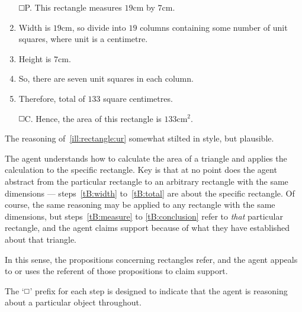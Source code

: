 \begin{note}[]
  \begin{illustration}\label{ill:rectangle:ur}
    \vspace{-\baselineskip}
    \begin{enumerate}[label=\(\protect\tBox\)\space\arabic*., ref=(\(\protect\tBox\)\space\arabic*), align=left, leftmargin=*]
    \item[\(\protect\tBox\)\space P.]\label{tB:measure} This rectangle measures \(19\text{cm}\) by \(7\text{cm}\).
    \item\label{tB:width} Width is \(19\text{cm}\), so divide into \(19\) columns containing some number of unit squares, where unit is a centimetre.
    \item\label{tB:height} Height is \(7\text{cm}\).
    \item\label{tB:counting} So, there are seven unit squares in each column.
    \item\label{tB:total} Therefore, total of \(133\) square centimetres.
    \item[\(\protect\tBox\)\space C.]\label{tB:conclusion} Hence, the area of this rectangle is \(133\text{cm}^{2}\).
    \end{enumerate}
    \vspace{-\baselineskip}
  \end{illustration}

  The reasoning of~\autoref{ill:rectangle:ur} somewhat stilted in style, but plausible.

  The agent understands how to calculate the area of a triangle and applies the calculation to the specific rectangle.
  Key is that at no point does the agent abstract from the particular rectangle to an arbitrary rectangle with the same dimensions --- steps~\ref{tB:width} to~\ref{tB:total} are about the specific rectangle.
  Of course, the same reasoning may be applied to any rectangle with the same dimensions, but steps~\ref{tB:measure} to \ref{tB:conclusion} refer to \emph{that} particular rectangle, and the agent claims support because of what they have established about that triangle.

  In this sense, the propositions concerning rectangles refer, and the agent appeals to or uses the referent of those propositions to claim support.

  The `\(\tBox\)' prefix for each step is designed to indicate that the agent is reasoning about a particular object throughout.


\end{note}
